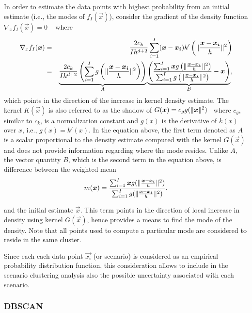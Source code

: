In order to estimate the data points with highest probability from an initial estimate (i.e., the modes of $f_{I}(\vec{x})$), consider the gradient of the density function $\nabla_{x} f_{I}(\vec{x})=0$ ~\cite{EstimationGradient} where
\begin{eqnarray}
\label{gradient}
    \nabla_{x} f_{I}(\bm{x}) & = & \frac{2 c_{k}}{I h^{d+2}} \sum_{i=1}^{I}(\bm{x}-\bm{x_{i}})k'\left(\lVert\frac{\bm{x}-\bm{x_{i}}}{h}\rVert^{2}\right) \nonumber \\
    & = & \underbrace{\frac{2 c_{k}}{I h^{d+2}} \left(\sum_{i=1}^{I} g\left(\lVert\frac{\bm{x}-\bm{x_{i}}}{h}\rVert^{2}\right)\right)}_{A}
    \underbrace{\left(\frac{\sum_{i=1}^{I}
    \bm{x} g\left(\lVert\frac{\bm{x}-\bm{x_{i}}}{h}\rVert^{2}\right)}{\sum_{i=1}^{I} g\left(\lVert\frac{\bm{x}-\bm{x_{i}}}{h}\rVert^{2}\right)}-\bm{x}\right)}_{B},
\end{eqnarray}
which points in the direction of the increase in kernel density estimate. The kernel $K(\vec{x})$ is also referred to as the shadow of $G(\bm{x})=c_{g} g(\lVert\bm{x}\rVert^{2})$~\cite{Mode-seekingMedoidshifts} where $c_{g}$, similar to $c_{k}$, is a normalization constant and $g(x)$ is the derivative of $k(x)$ over $x$, i.e., $g(x)=k'(x)$. In the equation above, the first term denoted as $A$ is a scalar proportional to the density estimate computed with the kernel $G(\vec{x})$ and does not provide information regarding where the mode resides. Unlike $A$, the vector quantity $B$, which is the second term in the equation above, is difference between the weighted mean
\begin{equation}
	m(\bm{x})=\frac{\sum_{i=1}^{I}\bm{x} g(\lVert\frac{\bm{x}-\bm{x_{i}}}{h}\rVert^{2})}{\sum_{i=1}^{I} g(\lVert\frac{\bm{x}-\bm{x_{i}}}{h}\rVert^{2})}.
\end{equation}

and the initial estimate $\vec{x}$. This term points in the direction of local increase in density using kernel $G(\vec{x})$, hence provides a means to find the mode of the density. Note that all points used to compute a particular mode are considered to reside in the same cluster.

Since each each data point $\vec{x_{i}}$ (or scenario) is considered as an empirical probability distribution function, this consideration allows to include in the scenario clustering analysis also the possible uncertainty associated with each scenario.

\subsubsection{DBSCAN }
\label{DBSCAN }

